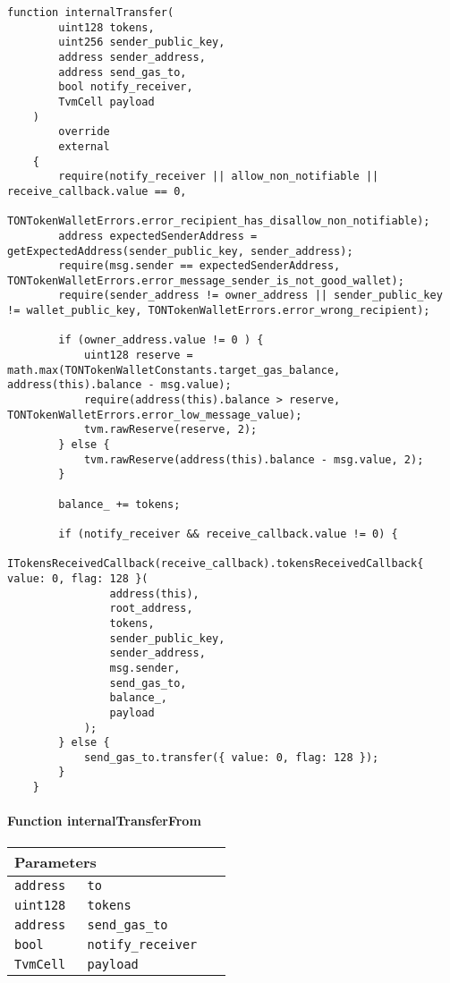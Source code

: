 \vspace{2cm}

\begin{lstlisting}[firstnumber=370]
    function internalTransfer(
        uint128 tokens,
        uint256 sender_public_key,
        address sender_address,
        address send_gas_to,
        bool notify_receiver,
        TvmCell payload
    )
        override
        external
    {
        require(notify_receiver || allow_non_notifiable || receive_callback.value == 0,
                TONTokenWalletErrors.error_recipient_has_disallow_non_notifiable);
        address expectedSenderAddress = getExpectedAddress(sender_public_key, sender_address);
        require(msg.sender == expectedSenderAddress, TONTokenWalletErrors.error_message_sender_is_not_good_wallet);
        require(sender_address != owner_address || sender_public_key != wallet_public_key, TONTokenWalletErrors.error_wrong_recipient);

        if (owner_address.value != 0 ) {
            uint128 reserve = math.max(TONTokenWalletConstants.target_gas_balance, address(this).balance - msg.value);
            require(address(this).balance > reserve, TONTokenWalletErrors.error_low_message_value);
            tvm.rawReserve(reserve, 2);
        } else {
            tvm.rawReserve(address(this).balance - msg.value, 2);
        }

        balance_ += tokens;

        if (notify_receiver && receive_callback.value != 0) {
            ITokensReceivedCallback(receive_callback).tokensReceivedCallback{ value: 0, flag: 128 }(
                address(this),
                root_address,
                tokens,
                sender_public_key,
                sender_address,
                msg.sender,
                send_gas_to,
                balance_,
                payload
            );
        } else {
            send_gas_to.transfer({ value: 0, flag: 128 });
        }
    }
\end{lstlisting}

\paragraph{Function internalTransferFrom}


\ifsoltables
\noindent\begin{tabular}{|l|l|p{5cm}|}\hline
\multicolumn{3}{|l|}{\bf Parameters}\\\hline
\tt address & \tt to &\\\hline
\tt uint128 & \tt tokens &\\\hline
\tt address & \tt send\_{}gas\_{}to &\\\hline
\tt bool & \tt notify\_{}receiver &\\\hline
\tt TvmCell & \tt payload &\\\hline
\end{tabular}
\fi

